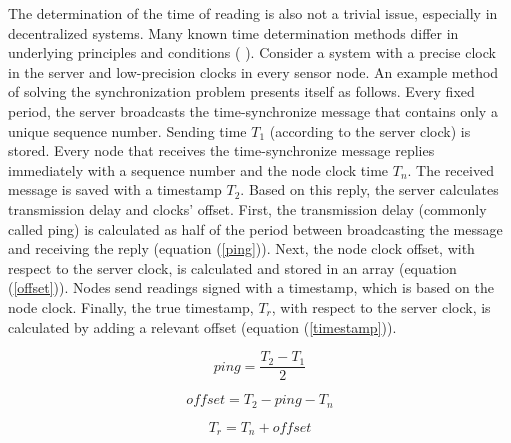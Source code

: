 The determination of the time of reading is also not a trivial issue, especially in decentralized systems. Many known time determination methods differ in underlying principles and conditions (\cite{time_sync} \cite{time_sync2}). Consider a system with a precise clock in the server and low-precision clocks in every sensor node. An example method of solving the synchronization problem presents itself as follows. Every fixed period, the server broadcasts the time-synchronize message that contains only a unique sequence number. Sending time $T_1$ (according to the server clock) is stored. Every node that receives the time-synchronize message replies immediately with a sequence number and the node clock time $T_n$. The received message is saved with a timestamp $T_2$. Based on this reply, the server calculates transmission delay and clocks’ offset. First, the transmission delay (commonly called ping) is calculated as half of the period between broadcasting the message and receiving the reply (equation (\ref{ping})). Next, the node clock offset, with respect to the server clock, is calculated and stored in an array (equation (\ref{offset})). Nodes send readings signed with a timestamp, which is based on the node clock. Finally, the true timestamp,  $T_r$, with respect to the server clock, is calculated by adding a relevant offset (equation (\ref{timestamp})).

\begin{equation}
	ping = \frac{T_2 - T_1}{2}
	\label{ping}
\end{equation}

\begin{equation}
	offset = T_2 - ping - T_n
	\label{offset}
\end{equation}

\begin{equation}
	T_r = T_n + offset
	\label{timestamp}
\end{equation}